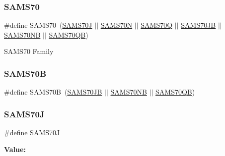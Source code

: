 \subsubsection{\texorpdfstring{SAMS70}{SAMS70}}
{\footnotesize\ttfamily \#define S\+A\+M\+S70~(\mbox{\hyperlink{group__sam__part__macros__group_gaf1a96c282da9b05972a653cf0b03b1a2}{S\+A\+M\+S70J}} $\vert$$\vert$ \mbox{\hyperlink{group__sam__part__macros__group_ga058ef2915b804280b5d38280a5b2bae3}{S\+A\+M\+S70N}} $\vert$$\vert$ \mbox{\hyperlink{group__sam__part__macros__group_ga3cc6724a7388e59987ccd2b9c9b3e0eb}{S\+A\+M\+S70Q}} $\vert$$\vert$ \mbox{\hyperlink{group__sam__part__macros__group_gaec6e38f478ca1b4b598f598d3e1fb3ff}{S\+A\+M\+S70\+JB}} $\vert$$\vert$ \mbox{\hyperlink{group__sam__part__macros__group_ga7a21f0445e52881a10dcf99486ea5332}{S\+A\+M\+S70\+NB}} $\vert$$\vert$ \mbox{\hyperlink{group__sam__part__macros__group_ga7597e22e69b9ad51c748d9fbcc3c0a9e}{S\+A\+M\+S70\+QB}})}

S\+A\+M\+S70 Family \mbox{\label{group__sam__part__macros__group_ga6cb8954dcb5e856286f08e421be34e66}} 
\subsubsection{\texorpdfstring{SAMS70B}{SAMS70B}}
{\footnotesize\ttfamily \#define S\+A\+M\+S70B~(\mbox{\hyperlink{group__sam__part__macros__group_gaec6e38f478ca1b4b598f598d3e1fb3ff}{S\+A\+M\+S70\+JB}} $\vert$$\vert$ \mbox{\hyperlink{group__sam__part__macros__group_ga7a21f0445e52881a10dcf99486ea5332}{S\+A\+M\+S70\+NB}} $\vert$$\vert$ \mbox{\hyperlink{group__sam__part__macros__group_ga7597e22e69b9ad51c748d9fbcc3c0a9e}{S\+A\+M\+S70\+QB}})}

\mbox{\label{group__sam__part__macros__group_gaf1a96c282da9b05972a653cf0b03b1a2}} 
\subsubsection{\texorpdfstring{SAMS70J}{SAMS70J}}
{\footnotesize\ttfamily \#define S\+A\+M\+S70J}

{\bfseries Value\+:}
\begin{DoxyCode}{0}
\DoxyCodeLine{( \(\backslash\)}
\DoxyCodeLine{    )}

\end{DoxyCode}
\mbox{\label{group__sam__part__macros__group_gaec6e38f478ca1b4b598f598d3e1fb3ff}} 
